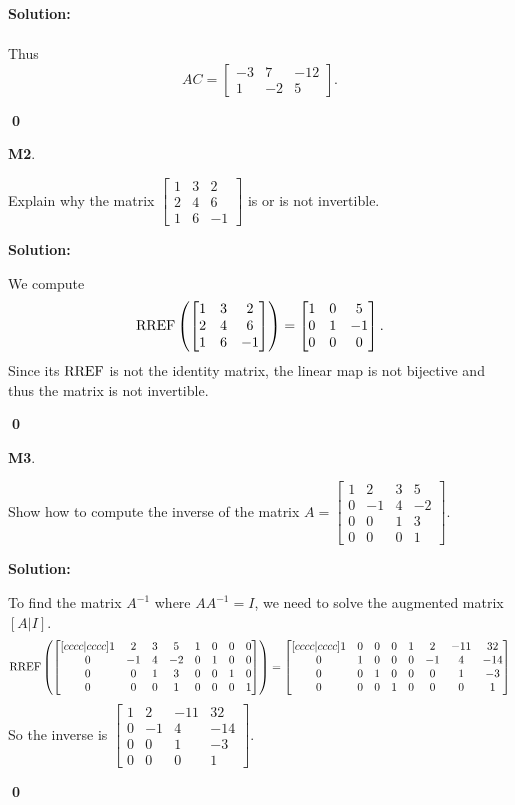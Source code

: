 \documentclass{article}
\newenvironment{problem}[1]
{
  \begin{flushleft}
  \textbf{#1}.
  \ignorespaces
}
{
  \end{flushleft}
}
\newenvironment{solution}
{
  \ignorespaces
  \textbf{Solution:}
}
{
  \ignorespacesafterend
  \begin{flushright}
  {\bfseries \qed}
  \end{flushright}
}
\begin{document}
\begin{solution}
\begin{align*}
\end{align*}
Thus
$$AC = \begin{bmatrix} -3 & 7 & -12 \\ 1 & -2 & 5 \end{bmatrix}.$$
\end{solution}

\begin{problem}{M2}
Explain why the matrix \(\begin{bmatrix}1 & 3 & 2  \\ 2 & 4 & 6  \\ 1 & 6 & -1 \end{bmatrix}\) is or is not invertible.
\end{problem}
\begin{solution}
We compute
\[\operatorname{RREF}\left(\begin{bmatrix}1 & 3 & 2  \\ 2 & 4 & 6  \\ 1 & 6 & -1 \end{bmatrix}\right) = \begin{bmatrix} 1 & 0 & 5 \\ 0 & 1 & -1 \\ 0 & 0 & 0 \end{bmatrix}.\]
Since its \(\operatorname{RREF}\) is not the identity matrix, the linear map is not bijective and thus the matrix is not invertible.
\end{solution}

\begin{problem}{M3}
Show how to compute the inverse of the matrix
\(A=\begin{bmatrix}
1 & 2 & 3 & 5 \\ 0 & -1 & 4 & -2 \\ 0 & 0 & 1 & 3 \\ 0 & 0 & 0 & 1
\end{bmatrix}\).
\end{problem}
\begin{solution}
To find the matrix \(A^{-1}\) where \(AA^{-1}=I\), we need to solve the augmented matrix \([A|I]\).
\[\operatorname{RREF}\left(\begin{bmatrix}[cccc|cccc] 1 & 2 & 3 & 5 & 1 & 0 & 0 & 0  \\ 0 & -1 & 4 & -2 & 0 & 1 & 0 & 0 \\ 0 & 0 & 1 & 3 & 0 & 0 & 1 & 0 \\ 0 & 0 & 0 & 1 & 0 & 0 & 0 & 1 \end{bmatrix}\right) = \begin{bmatrix}[cccc|cccc] 1 & 0 & 0 &0 & 1 & 2 & -11 & 32 \\ 0 & 1 & 0 & 0 & 0 & -1 & 4 & -14 \\ 0 & 0 & 1 & 0 & 0 & 0 & 1 & -3 \\ 0 & 0 & 0 & 1 & 0 & 0 & 0 & 1 \end{bmatrix}\]
So the inverse is \(\begin{bmatrix}  1 & 2 & -11 & 32 \\ 0 & -1 & 4 & -14 \\  0 & 0 & 1 & -3 \\ 0 & 0 & 0 & 1 \end{bmatrix}\).
\end{solution}
\end{document}
